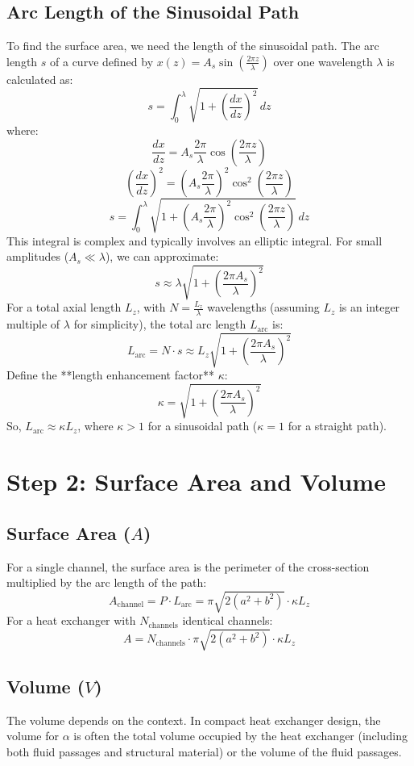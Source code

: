\documentclass[]{article}
\begin{document}
\subsection{Arc Length of the Sinusoidal Path}
To find the surface area, we need the length of the sinusoidal path. The arc length \(s\) of a curve defined by \(x(z) = A_s \sin\left(\frac{2\pi z}{\lambda}\right)\) over one wavelength \(\lambda\) is calculated as:
\[
s = \int_0^\lambda \sqrt{1 + \left(\frac{dx}{dz}\right)^2} \, dz
\]
where:
\[
\frac{dx}{dz} = A_s \frac{2\pi}{\lambda} \cos\left(\frac{2\pi z}{\lambda}\right)
\]
\[
\left(\frac{dx}{dz}\right)^2 = \left(A_s \frac{2\pi}{\lambda}\right)^2 \cos^2\left(\frac{2\pi z}{\lambda}\right)
\]
\[
s = \int_0^\lambda \sqrt{1 + \left(A_s \frac{2\pi}{\lambda}\right)^2 \cos^2\left(\frac{2\pi z}{\lambda}\right)} \, dz
\]
This integral is complex and typically involves an elliptic integral. For small amplitudes (\(A_s \ll \lambda\)), we can approximate:
\[
s \approx \lambda \sqrt{1 + \left(\frac{2\pi A_s}{\lambda}\right)^2}
\]
For a total axial length \(L_z\), with \(N = \frac{L_z}{\lambda}\) wavelengths (assuming \(L_z\) is an integer multiple of \(\lambda\) for simplicity), the total arc length \(L_{\text{arc}}\) is:
\[
L_{\text{arc}} = N \cdot s \approx L_z \sqrt{1 + \left(\frac{2\pi A_s}{\lambda}\right)^2}
\]
Define the **length enhancement factor** \(\kappa\):
\[
\kappa = \sqrt{1 + \left(\frac{2\pi A_s}{\lambda}\right)^2}
\]
So, \(L_{\text{arc}} \approx \kappa L_z\), where \(\kappa > 1\) for a sinusoidal path (\(\kappa = 1\) for a straight path).

\section{Step 2: Surface Area and Volume}
\subsection{Surface Area (\(A\))}
For a single channel, the surface area is the perimeter of the cross-section multiplied by the arc length of the path:
\[
A_{\text{channel}} = P \cdot L_{\text{arc}} = \pi \sqrt{2(a^2 + b^2)} \cdot \kappa L_z
\]
For a heat exchanger with \(N_{\text{channels}}\) identical channels:
\[
A = N_{\text{channels}} \cdot \pi \sqrt{2(a^2 + b^2)} \cdot \kappa L_z
\]

\subsection{Volume (\(V\))}
The volume depends on the context. In compact heat exchanger design, the volume for \(\alpha\) is often the total volume occupied by the heat exchanger (including both fluid passages and structural material) or the volume of the fluid passages.
\end{document}
